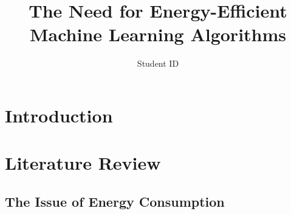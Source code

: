 \documentclass[a4paper, 11pt]{article}
\title{The Need for Energy-Efficient Machine Learning Algorithms}
\author{Student ID}
\date{}
\begin{document}
    \maketitle

    \section{Introduction}

    \section{Literature Review}

    \subsection{The Issue of Energy Consumption}


    \cite{fan-2020}
    \cite{schwartz-2019}
    \cite{bender-2021}
    \cite{amodei-hernandez-2021}
    \cite{silver-2017}
    \cite{lacoste-2019}
    \cite{cook-2017}
    \cite{scottish-forestry}
    \cite{data-center-survey}
    \cite{jain-2019}
    \cite{un-social-survey}
    \cite{dodge-2019}
    \cite{so-2019}
    \cite{acharyya-2019}
    \cite{xu-2021}
    \cite{he-2015}  
    \cite{yoo-2011}
    \cite{klein-2008}
    \cite{lottick-2019}
    \cite{jouppi-2017}
    \cite{kumar-2020}
    \cite{leeuw-2021}
    \cite{wang-selvan-2021}
    \cite{liu-2021}
    \cite{davies-2018}
    \cite{tang-2018}
    \cite{agrawal-2021}
    \cite{gokmen-haensch-2019}
    \cite{paszke-2019}
    \cite{david-2020}
    \cite{han-2015}
    \cite{iandola-2016}
    \cite{redmon-2016}
    \cite{dehghani-2018}
    \cite{teerapittayanon-2017}
    \cite{sennrich-2015}
    \cite{akhand-2008}
    \cite{yang-2020}
    \cite{simonyan-2014}
    \cite{peters-2018}
    \cite{ruder-2018}


    
\end{document}

